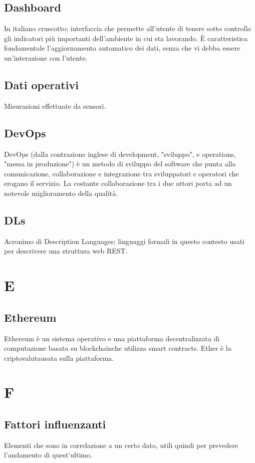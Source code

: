 \subsection*{Dashboard}
In italiano cruscotto; interfaccia che permette all'utente di tenere sotto controllo gli indicatori più importanti dell'ambiente in cui sta lavorando. È caratteristica fondamentale l'aggiornamento automatico dei dati, senza che vi debba essere un'interazione con l'utente.

\subsection*{Dati operativi}
Misurazioni effettuate da sensori.

\subsection{DevOps}
DevOps (dalla contrazione inglese di development, "sviluppo", e operations, "messa in produzione") è un metodo di sviluppo del software che punta alla comunicazione, collaborazione e integrazione tra sviluppatori e operatori che erogano il servizio. La costante collaborazione tra i due attori porta ad un notevole miglioramento della qualità.

\subsection*{DLs}
Acronimo di Description Languages; linguaggi formali in questo contesto usati per descrivere una struttura web REST\glo.

\section*{E}

\subsection*{Ethereum}
Ethereum è un sistema operativo e una piattaforma decentralizzata di computazione basata su blockchain\glosp che utilizza smart contracts\glo. Ether è la criptovaluta\glosp usata sulla piattaforma.

\section*{F}

\subsection*{Fattori influenzanti}
Elementi che sono in correlazione a un certo dato, utili quindi per prevedere l'andamento di quest'ultimo.


